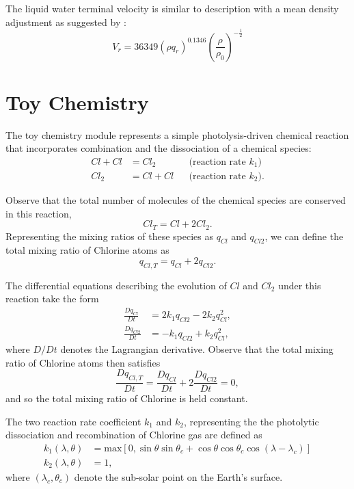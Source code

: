 \documentclass[times,doublespace]{fldauth}
\begin{document}
{\begin{appendix}
The liquid water terminal velocity is similar to \cite{soong1973comparison} description with a mean density adjustment as suggested by \cite{kessler1969distribution}:
\begin{equation}
V_r = 36349(\rho q_r)^{0.1346}\left(\frac{\rho}{\rho_0}\right)^{-\frac{1}{2}}
\end{equation}


\section{Toy Chemistry} \label{sec:ToyChemistry}

The toy chemistry module represents a simple photolysis-driven chemical reaction that incorporates combination and the dissociation of a chemical species:
\begin{align}
Cl + Cl &= Cl_2 && \mbox{(reaction rate $k_1$)}\\
Cl_2&=Cl+Cl && \mbox{(reaction rate $k_2$)}.
\end{align}

Observe that the total number of molecules of the chemical species are conserved in this reaction,
\begin{equation}
Cl_T=Cl+2 Cl_2.
\end{equation}  Representing the mixing ratios of these species as $q_{Cl}$ and $q_{Cl2}$, we can define the total mixing ratio of Chlorine atoms as
\begin{equation}
q_{Cl,T} = q_{Cl} + 2 q_{Cl2}.
\end{equation}

The differential equations describing the evolution of $Cl$ and $Cl_2$ under this reaction take the form
\begin{align}
\frac{Dq_{Cl}}{Dt} &= 2k_1 q_{Cl2} -2k_2 q_{Cl}^2, \\
\frac{Dq_{Cl2}}{Dt} &= -k_1 q_{Cl2} + k_2 q_{Cl}^2,
\end{align} where $D/Dt$ denotes the Lagrangian derivative.  Observe that the total mixing ratio of Chlorine atoms then satisfies
\begin{equation}
\frac{Dq_{Cl,T}}{Dt} = \frac{Dq_{Cl}}{Dt} + 2 \frac{Dq_{Cl2}}{Dt} = 0,
\end{equation} and so the total mixing ratio of Chlorine is held constant.

The two reaction rate coefficient  $k_1$ and $k_2$, representing the the photolytic dissociation and recombination of Chlorine gas are defined as
\begin{align}
k_1(\lambda,\theta)&= \mbox{max} \left[ 0,\sin\theta\sin\theta_c+\cos\theta\cos\theta_c
\cos(\lambda-\lambda_c) \right] \\
k_2(\lambda,\theta)&=1,
\end{align} where $(\lambda_c, \theta_c)$ denote the sub-solar point on the Earth's surface.


\end{appendix}}
\end{document}
